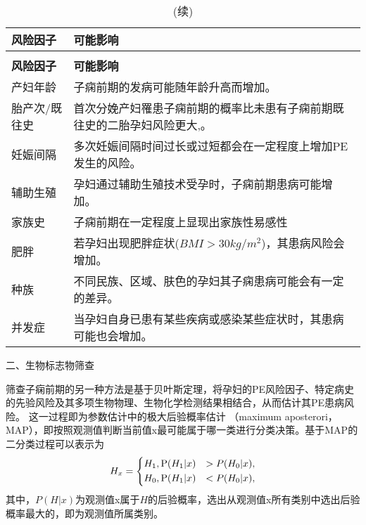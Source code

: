 \begin{center}
	\begin{longtable}{m{2.5cm}<{\centering}m{12cm}<{\centering}}
		\caption{\label{tab:riskfactors}常见的子痫前期风险因子}\\
        \toprule
        \textbf{风险因子} & \textbf{可能影响}\\
        \midrule
        \endfirsthead
        \caption[]{(续)}\\
        \midrule
        \textbf{风险因子} & \textbf{可能影响}\\
        \midrule
        \endhead 
        \midrule
        \endfoot
        \bottomrule
        \endlastfoot
        产妇年龄&  子痫前期的发病可能随年龄升高而增加\cite{Duckitt2005,FIGO,Yogev2010,Poon2010}。    \\
        胎产次/既往史&    首次分娩产妇罹患子痫前期的概率比未患有子痫前期既往史的二胎孕妇风险更大\cite{Lee2000,Duckitt2005,Coonrod1995,Robillard1993,Sonia2009},。   \\
        妊娠间隔 & 多次妊娠间隔时间过长或过短都会在一定程度上增加PE发生的风险\cite{Rousso2002,Duckitt2005,Conde2007,Mignini2016,Rolv2002}。\\
        辅助生殖 & 孕妇通过辅助生殖技术受孕时，子痫前期患病可能增加\cite{Jackson2004,Trogstad2009,Martin2016}。\\
        家族史 & 子痫前期在一定程度上显现出家族性易感性\cite{ARNGRIMSSON1990,OAG9,Williams2011,Cincotta1998,FIGO}\\
        肥胖 & 若孕妇出现肥胖症状($BMI>30kg/m^2$)，其患病风险会增加\cite{Duckitt2005,Williams2011,FIGO,Zintzaras2006,Sebire2001}。\\
        种族&不同民族、区域、肤色的孕妇其子痫患病可能会有一定的差异\cite{Ghosh2014,Khalil2013}。\\
        并发症 & 当孕妇自身已患有某些疾病或感染某些症状时，其患病可能也会增加\cite{FIGO,Ray2016,OAG9,Lee2000,Garner1990,Martinell1990,Stamilio2000,Dreyfus2001,Marchetti2016}。\\
	\end{longtable}
\end{center}
\raggedbottom
二、生物标志物筛查

筛查子痫前期的另一种方法是基于贝叶斯定理，将孕妇的PE风险因子、特定病史的先验风险及其多项生物物理、生物化学检测结果相结合，从而估计其PE患病风险\cite{FIGO}。
这一过程即为参数估计中的极大后验概率估计
（maximum aposterori，MAP），即按照观测值判断当前值x最可能属于哪一类进行分类决策\cite{Qiu2012}。基于MAP的二分类过程可以表示为
\begin{equation}
    \label{equ:maxap}
    H_{x}=
    \left \{
    \begin{aligned}
        &H_{1}, \text P(H_{1}|x)&>P(H_{0}|x), \\
        &H_{0}, \text P(H_{1}|x)&<P(H_{0}|x),
    \end{aligned}
    \right.  
\end{equation}
其中，$P(H|x)$为观测值x属于$H$的后验概率，选出从观测值x所有类别中选出后验概率最大的，即为观测值所属类别。

